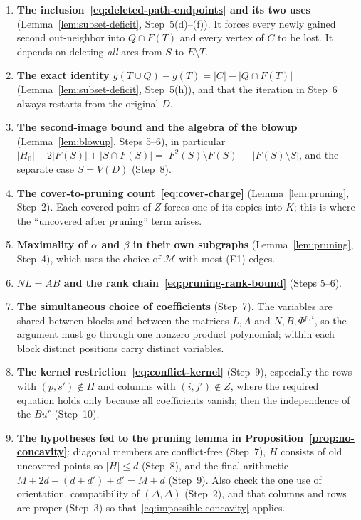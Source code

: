 \documentclass[11pt]{article}
\theoremstyle{remark}
\newcommand{\abs}[1]{\lvert #1\rvert}
\begin{document}
\begin{enumerate}[leftmargin=2em]
\item \textbf{The inclusion~\eqref{eq:deleted-path-endpoints} and its two
uses} (Lemma~\ref{lem:subset-deficit}, Step~5(d)--(f)). It forces every newly
gained second out-neighbor into $Q\cap F(T)$ and every vertex of $C$ to be
lost. It depends on deleting \emph{all} arcs from $S$ to $E\setminus T$.
\item \textbf{The exact identity
$g(T\cup Q)-g(T)=\abs C-\abs{Q\cap F(T)}$} (Lemma~\ref{lem:subset-deficit},
Step~5(h)), and that the iteration in Step~6 always restarts from the
original $D$.
\item \textbf{The second-image bound and the algebra of the blowup}
(Lemma~\ref{lem:blowup}, Steps 5--6), in particular
$\abs{H_0}-2\abs{F(S)}+\abs{S\cap F(S)}
=\abs{F^2(S)\setminus F(S)}-\abs{F(S)\setminus S}$, and the separate case
$S=V(D)$ (Step~8).
\item \textbf{The cover-to-pruning count~\eqref{eq:cover-charge}}
(Lemma~\ref{lem:pruning}, Step~2). Each covered point of $Z$ forces one of
its copies into $K$; this is where the ``uncovered after pruning'' term
arises.
\item \textbf{Maximality of $\alpha$ and $\beta$ in their own subgraphs}
(Lemma~\ref{lem:pruning}, Step~4), which uses the choice of $\mathcal M$ with
most (E1) edges.
\item \textbf{$NL=AB$ and the rank chain~\eqref{eq:pruning-rank-bound}}
(Steps 5--6).
\item \textbf{The simultaneous choice of coefficients} (Step~7). The
variables are shared between blocks and between the matrices $L,A$ and
$N,B,\Phi^{p,i}$, so the argument must go through one nonzero product
polynomial; within each block distinct positions carry distinct variables.
\item \textbf{The kernel restriction~\eqref{eq:conflict-kernel}} (Step~9),
especially the rows with $(p,s')\notin H$ and columns with $(i,j')\notin Z$,
where the required equation holds only because all coefficients vanish; then
the independence of the $Bu^r$ (Step~10).
\item \textbf{The hypotheses fed to the pruning lemma in
Proposition~\ref{prop:no-concavity}}: diagonal members are conflict-free
(Step~7), $H$ consists of old uncovered points so $\abs H\le d$ (Step~8),
and the final arithmetic $M+2d-(d+d')+d'=M+d$ (Step~9). Also check the one
use of orientation, compatibility of $(\Delta,\Delta)$ (Step~2), and that
columns and rows are proper (Step~3) so
that~\eqref{eq:impossible-concavity} applies.
\end{enumerate}



\end{document}
